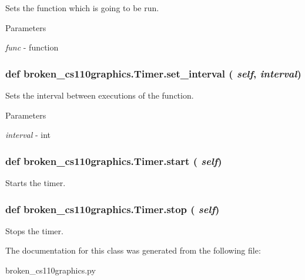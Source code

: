 Sets the function which is going to be run. 
\begin{DoxyParams}{Parameters}
\item[{\em func}]-\/ function \end{DoxyParams}
\hypertarget{classbroken__cs110graphics_1_1Timer_a51bf31ff89789b8d58cda32fadaafc42}{
\subsubsection[{set\_\-interval}]{\setlength{\rightskip}{0pt plus 5cm}def broken\_\-cs110graphics.Timer.set\_\-interval ( {\em self}, \/   {\em interval})}}
\label{classbroken__cs110graphics_1_1Timer_a51bf31ff89789b8d58cda32fadaafc42}


Sets the interval between executions of the function. 
\begin{DoxyParams}{Parameters}
\item[{\em interval}]-\/ int \end{DoxyParams}
\hypertarget{classbroken__cs110graphics_1_1Timer_a52d4c189cd76c43481ac173291b960bd}{
\subsubsection[{start}]{\setlength{\rightskip}{0pt plus 5cm}def broken\_\-cs110graphics.Timer.start ( {\em self})}}
\label{classbroken__cs110graphics_1_1Timer_a52d4c189cd76c43481ac173291b960bd}


Starts the timer. \hypertarget{classbroken__cs110graphics_1_1Timer_a4dd29b6f9ef5579d86e57e64f5709538}{
\subsubsection[{stop}]{\setlength{\rightskip}{0pt plus 5cm}def broken\_\-cs110graphics.Timer.stop ( {\em self})}}
\label{classbroken__cs110graphics_1_1Timer_a4dd29b6f9ef5579d86e57e64f5709538}


Stops the timer. 

The documentation for this class was generated from the following file:\begin{DoxyCompactItemize}
\item 
broken\_\-cs110graphics.py\end{DoxyCompactItemize}
